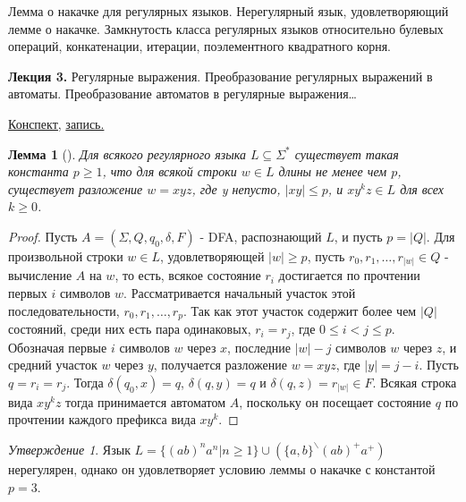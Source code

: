 \documentclass[a4paper]{article}
\newcommand{\mybox}{%
    \collectbox{%
        \setlength{\fboxsep}{1pt}%
        \fbox{\BOXCONTENT}%
    }%
}
\theoremstyle{indented}
\newtheorem{lemma}{Лемма}
\theoremstyle{definition}
\theoremstyle{remark}
\newtheorem{stat}{Утверждение}
\begin{document}
Лемма о накачке для регулярных языков. Нерегулярный язык, удовлетворяющий лемме о накачке. Замкнутость класса регулярных языков относительно булевых операций, конкатенации, итерации, поэлементного квадратного корня.

\hrulefill

\textbf{Лекция 3.} Регулярные выражения. Преобразование регулярных выражений в автоматы. Преобразование автоматов в регулярные выражения\ldots

\begin{flushright}
    \mybox{
        \href{https://users.math-cs.spbu.ru/~okhotin/teaching/tcs_fl_2021/okhotin_tcs_fl_2021_l3.pdf}{Конспект,}
        \href{https://disk.yandex.ru/d/knoQ44wLmGDwwQ/2021-2022%20учебный%20год%20(осенний%20семестр)/2%20курс/Теоретическая%20информатика/Теоретическая%20информатика%2C%20лекция%2C%2015.09.2021.mp4}{запись.}
    }
\end{flushright}

\begin{lemma}[]
    Для всякого регулярного языка $L \subseteq \Sigma^*$ существует такая константа $p \geq 1$, что для всякой строки $w \in L$ длины не менее чем $p$, существует разложение $w = xyz$, где y непусто, $|xy| \leq p$, и $xy^kz \in L$ для всех $k \geq 0$.
\end{lemma}

\begin{proof}
    Пусть $A = (\Sigma, Q, q_0, \delta, F )$ - DFA, распознающий $L$, и пусть $p = |Q|$. Для произвольной строки $w \in L$, удовлетворяющей $|w| \geq p$, пусть $r_0, r_1, \ldots , r_{|w|} \in Q$ - вычисление $A$ на $w$, то есть, всякое состояние $r_i$ достигается по прочтении первых $i$ символов $w$. Рассматривается начальный участок этой последовательности, $r_0, r_1, \ldots , r_p$. Так как этот участок содержит более чем $|Q|$ состояний, среди них есть пара одинаковых, $r_i = r_j$, где $0 \leq i < j \leq p$. \\ 

    Обозначая первые $i$ символов $w$ через $x$, последние $|w|-j$ символов $w$ через $z$, и средний участок $w$ через $y$, получается разложение $w = xyz$, где $|y| = j - i$. Пусть $q = r_i = r_j$. Тогда $\delta(q_0,x) = q$, $\delta(q,y) = q$ и $\delta(q,z) = r_{|w|} \in F$. Всякая строка вида $xy^kz$ тогда принимается автоматом $A$, поскольку он посещает состояние $q$ по прочтении каждого префикса вида $xy^k$.
\end{proof}

\begin{stat}
    Язык $L = \{ (ab)^n a^n | n \geq 1 \} \cup (\{a, b\}^ \backslash (ab)^+ a^+ )$ нерегулярен, однако он удовлетворяет условию леммы о накачке с константой $p = 3$.
\end{stat}
\end{document}
